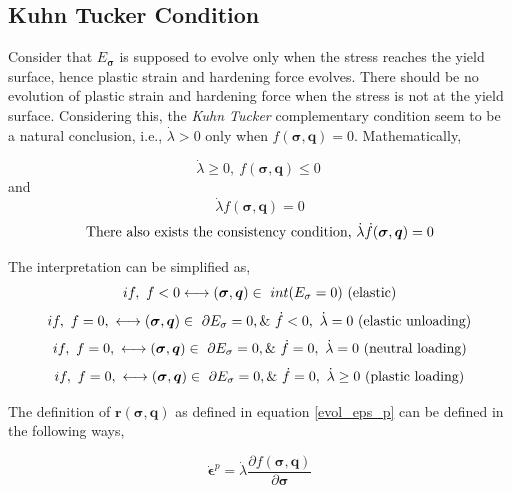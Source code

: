  \subsection*{Kuhn Tucker Condition}
 Consider that $E_{\bm \sigma} $ is supposed to evolve only when the stress reaches the yield surface, hence plastic strain and hardening force evolves.  There should be no evolution of  plastic strain and hardening force when the stress is not at the yield surface. Considering this, the \textit{Kuhn Tucker} complementary condition seem to be a natural conclusion, i.e., $\dot{\lambda} > 0$ only when $f(\bm \sigma, \bm q)=0$. Mathematically\cite{simo},
 
 \begin{equation}
 \dot{\lambda} \geq 0,~ f(\bm\sigma, \bm q) \leq 0\
 \end{equation}
 \textnormal{and }
 \begin{equation}
 \dot{\lambda} f(\bm\sigma, \bm q) =0
\end{equation}
\begin{equation}
 \textnormal{There also exists the consistency condition,~}
 \dot{\lambda}\dot{f}(\bm\sigma, \bm q)=0
 \end{equation}
 
 The interpretation can be simplified as\cite{simo},
 \begin{equation}
	 if,~f <0 \longleftrightarrow (\bm\sigma, \bm q) \in ~ int (E_{\sigma}=0) ~ \textnormal{(elastic)}
	 \end{equation}
	 \begin{equation}
	 if, ~f=0, ~ \longleftrightarrow (\bm\sigma, \bm q) \in ~ \partial E_{\sigma}=0, \&~
	 \dot{f}<0, ~ \dot{\lambda}=0 \textnormal{~(elastic unloading)}
	 \end{equation}
	 \begin{equation}
	 if, ~f=0, ~ \longleftrightarrow (\bm\sigma, \bm q) \in ~ \partial E_{\sigma}=0, \&~ 
	 \dot{f}=0, ~ \dot{\lambda}=0 \textnormal{~(neutral loading)}
	 \end{equation}
	 \begin{equation}
	 if, ~f=0, ~ \longleftrightarrow (\bm\sigma, \bm q) \in ~ \partial E_{\sigma}=0, \&~ 
	 \dot{f}=0, ~ \dot{\lambda}\geq 0 \textnormal{~(plastic loading)}
 \end{equation}
 
 The definition of $\bm r(\bm \sigma, \bm q)$ as defined in equation \ref{evol_eps_p} can be defined in the following ways,
 
 \begin{equation}
 	\dot{\bm \epsilon}^p = \dot{\lambda} \frac{\partial f(\bm \sigma, \bm q)}{\partial{\bm \sigma}}
 	\label{evol_eps_p_defined}
 \end{equation}
 
